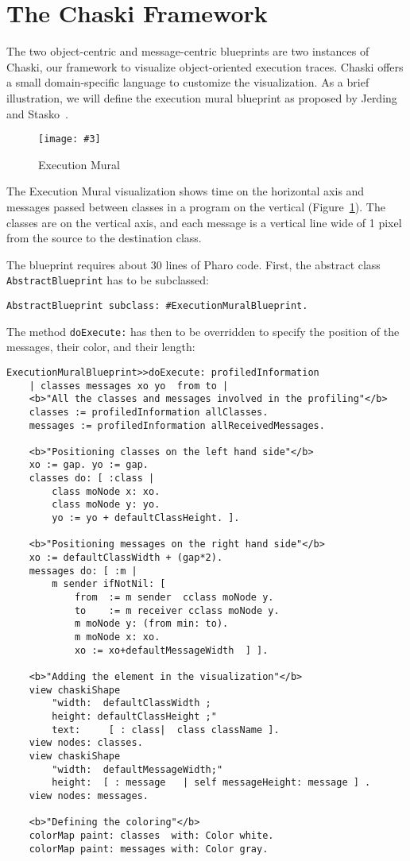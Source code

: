 \documentclass{sig-alternate}
\newcommand{\ct}{\lstinline[backgroundcolor=\color{white},basicstyle=\footnotesize\ttfamily]}
\newcommand{\fig}[4]{
	\begin{figure}[#1]
		\centering
		\texttt{[image: \#3]}
		\caption{\label{fig:#3}#4}
	\end{figure}}
\newcommand{\seclabel}[1]{\label{sec:#1}}
\newcommand{\figref}[1]{Figure~\ref{fig:#1}}
\begin{document}


\section{The Chaski Framework}\seclabel{framework}

The two object-centric and message-centric blueprints are two instances of Chaski, our framework to visualize object-oriented execution traces. 
Chaski offers a small domain-specific language to customize the visualization. As a brief illustration, we will define the execution mural blueprint as proposed by Jerding and Stasko~\cite{Jerd98a}.

\fig{}{0.5}{ExecutionMuralDemo}{Execution Mural}

The Execution Mural visualization shows time on the horizontal axis and messages passed between classes in a program on the vertical (\figref{ExecutionMuralDemo}). The classes are on the vertical axis, and each message is a vertical line wide of 1 pixel from the source to the destination class.

The blueprint requires about 30 lines of Pharo code. First, the abstract class \ct{AbstractBlueprint} has to be subclassed:

\begin{lstlisting}[]
AbstractBlueprint subclass: #ExecutionMuralBlueprint.
\end{lstlisting}

The method \ct{doExecute:} has then to be overridden to specify the position of the messages, their color, and their length:

\begin{lstlisting}[]
ExecutionMuralBlueprint>>doExecute: profiledInformation
	| classes messages xo yo  from to |
	<b>"All the classes and messages involved in the profiling"</b>
	classes := profiledInformation allClasses.
	messages := profiledInformation allReceivedMessages.
	
	<b>"Positioning classes on the left hand side"</b>
	xo := gap. yo := gap.
	classes do: [ :class | 
		class moNode x: xo.   
		class moNode y: yo.
		yo := yo + defaultClassHeight. ].
		
	<b>"Positioning messages on the right hand side"</b>
	xo := defaultClassWidth + (gap*2).
	messages do: [ :m | 
		m sender ifNotNil: [
			from  := m sender  cclass moNode y.
			to    := m receiver cclass moNode y.
			m moNode y: (from min: to).
			m moNode x: xo.
			xo := xo+defaultMessageWidth  ] ].
	
	<b>"Adding the element in the visualization"</b>
	view chaskiShape 
		"width:  defaultClassWidth ;
		height: defaultClassHeight ;"
		text:     [ : class|  class className ].
	view nodes: classes.
	view chaskiShape 
		"width:  defaultMessageWidth;"
		height:  [ : message   | self messageHeight: message ] .
	view nodes: messages.
	
	<b>"Defining the coloring"</b>
	colorMap paint: classes  with: Color white.
	colorMap paint: messages with: Color gray.
\end{lstlisting}
\end{document}
